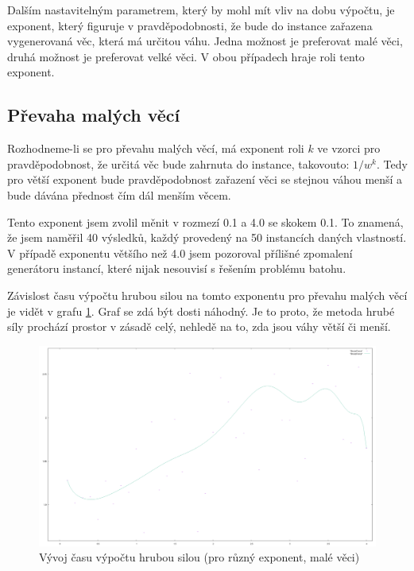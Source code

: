\documentclass[12pt,a4paper]{article}
\begin{document}
Dalším nastavitelným parametrem, který by mohl mít vliv na dobu výpočtu, je exponent, který figuruje v pravděpodobnosti, že bude do instance zařazena vygenerovaná věc, která má určitou váhu. Jedna možnost je preferovat malé věci, druhá možnost je preferovat velké věci. V obou případech hraje roli tento exponent.



\subsection{Převaha malých věcí}

Rozhodneme-li se pro převahu malých věcí, má exponent roli $k$ ve vzorci pro pravděpodobnost, že určitá věc bude zahrnuta do instance, takovouto: $1/w^k$. Tedy pro větší exponent bude pravděpodobnost zařazení věci se stejnou váhou menší a bude dávána přednost čím dál menším věcem.

Tento exponent jsem zvolil měnit v rozmezí 0.1 a 4.0 se skokem 0.1. To znamená, že jsem naměřil 40 výsledků, každý provedený na 50 instancích daných vlastností. V případě exponentu většího než 4.0 jsem pozoroval přílišné zpomalení generátoru instancí, které nijak nesouvisí s řešením problému batohu.

Závislost času výpočtu hrubou silou na tomto exponentu pro převahu malých věcí je vidět v grafu \ref{exp/small/BruteForce}. Graf se zdá být dosti náhodný. Je to proto, že metoda hrubé síly prochází prostor v zásadě celý, nehledě na to, zda jsou váhy větší či menší.

\begin{figure}[H]
\begin{center}
\includegraphics[width=\textwidth]{exp/small/BruteForce}
\caption{Vývoj času výpočtu hrubou silou (pro různý exponent, malé věci)}
\label{exp/small/BruteForce}
\end{center}
\end{figure}
\end{document}
